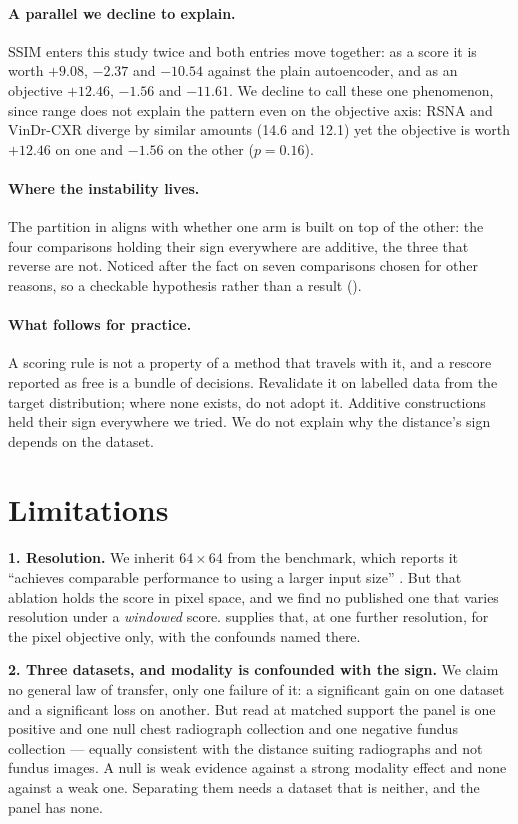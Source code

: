 \documentclass[pmlr,twocolumn,10pt]{jmlr} %
\begin{document}
\paragraph*{A parallel we decline to explain.}
SSIM enters this study twice and both entries move together: as a score it is worth $+9.08$,
$-2.37$ and $-10.54$ against the plain autoencoder, and as an objective $+12.46$, $-1.56$ and
$-11.61$. We decline to call these one phenomenon, since range does not explain the pattern
even on the objective axis: RSNA and VinDr-CXR diverge by similar amounts (14.6 and 12.1)
yet the objective is worth $+12.46$ on one and $-1.56$ on the other ($p=0.16$).

\paragraph*{Where the instability lives.}
The partition in  aligns with whether one arm is built on top of
the other: the four comparisons holding their sign everywhere are additive, the three that
reverse are not. Noticed after the fact on seven comparisons chosen for other reasons, so a
checkable hypothesis rather than a result ().

\paragraph*{What follows for practice.}
A scoring rule is not a property of a method that travels with it, and a rescore reported as
free is a bundle of decisions. Revalidate it on labelled data from the target distribution;
where none exists, do not adopt it. Additive constructions held their sign everywhere we
tried. We do not explain why the distance's sign depends on the dataset.

\section{Limitations}
\label{sec:limitations}
\textbf{1. Resolution.} We inherit $64\times64$ from the benchmark, which reports it
``achieves comparable performance to using a larger input size''
\citep{cai2025medianomaly}. But that ablation holds the score in pixel space, and we find no
published one that varies resolution under a \emph{windowed} score.
 supplies that, at one further resolution, for the pixel objective
only, with the confounds named there.

\textbf{2. Three datasets, and modality is confounded with the sign.} We claim no general law of transfer, only one failure of it: a significant gain on one
dataset and a significant loss on another. But read at matched support the panel is one
positive and one null chest radiograph collection and one negative fundus collection ---
equally consistent with the distance suiting radiographs and not fundus images. A null is
weak evidence against a strong modality effect and none against a weak one. Separating them
needs a dataset that is neither, and the panel has none.
\end{document}
